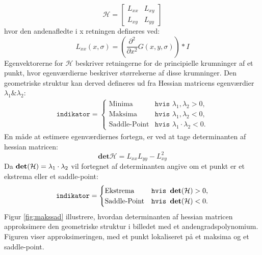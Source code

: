 \begin{equation}
\mathcal{H} = 
 \begin{bmatrix}
 	L_{xx} & L_{xy} \\
 	L_{xy} & L_{yy}
 \end{bmatrix}
 \label{hessianmatrixblob}
\end{equation}
hvor den andenafledte i x retningen defineres ved:
\begin{equation}
L_{xx}(x, \sigma) = (\frac{\partial^2 }{\partial x^2 } G(x,y,\sigma)) * I
\label{lxx}
\end{equation}
Egenvektorerne for $\mathcal{H}$ beskriver retningerne for de principielle krumninger af et punkt, hvor egenværdierne beskriver størrelserne af disse krumninger. Den geometriske struktur kan derved defineres ud fra Hessian matricens egenværdier $\lambda_1 \& \lambda_2$:
\begin{equation}
\begin{split}
\texttt{indikator} = 
\begin{cases}
\text{Minima} & \texttt{hvis } \lambda_1, \lambda_2 > 0, \\
\text{Maksima}& \texttt{hvis } \lambda_1, \lambda_2 < 0,  \\
\text{Saddle-Point} & \texttt{hvis } \lambda_1 \cdot \lambda_2 < 0.
\end{cases}
\end{split}
\label{maxsurp}
\end{equation}
En måde at estimere egenværdiernes fortegn, er ved at tage determinanten af hessian matricen:
\begin{equation}
\textbf{det}\mathcal{H} = L_{xx}L_{yy}-L_{xy}^2
\label{detofhessian}
\end{equation}
Da $\bold{det}(\mathcal{H})=\lambda_1 \cdot \lambda_2$ vil fortegnet af determinanten angive om et punkt er et ekstrema eller et saddle-point:
\begin{equation}
\begin{split}
\texttt{indikator} = 
\begin{cases}
\text{Ekstrema}& \texttt{hvis } \bold{det}(\mathcal{H}) > 0,  \\
\text{Saddle-Point} & \texttt{hvis } \bold{det}(\mathcal{H}) < 0.
\end{cases}
\end{split}
\label{detman}
\end{equation}
Figur \ref{fig:makssad} illustrere, hvordan determinanten af hessian matricen approksimere den geometriske struktur i billedet med et andengradspolynomium. Figuren viser approksimeringen, med et punkt lokaliseret på et maksima og et saddle-point.
